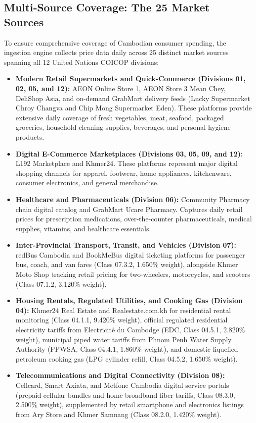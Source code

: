 \subsection{Multi-Source Coverage: The 25 Market Sources}
\hs To ensure comprehensive coverage of Cambodian consumer spending, the ingestion engine collects price data daily across 25 distinct market sources spanning all 12 United Nations COICOP divisions:
\begin{itemize}
    \item \textbf{Modern Retail Supermarkets and Quick-Commerce (Divisions 01, 02, 05, and 12):} AEON Online Store 1, AEON Store 3 Mean Chey, DeliShop Asia, and on-demand GrabMart delivery feeds (Lucky Supermarket Chroy Changva and Chip Mong Supermarket Eden). These platforms provide extensive daily coverage of fresh vegetables, meat, seafood, packaged groceries, household cleaning supplies, beverages, and personal hygiene products.
    \item \textbf{Digital E-Commerce Marketplaces (Divisions 03, 05, 09, and 12):} L192 Marketplace and Khmer24. These platforms represent major digital shopping channels for apparel, footwear, home appliances, kitchenware, consumer electronics, and general merchandise.
    \item \textbf{Healthcare and Pharmaceuticals (Division 06):} Community Pharmacy chain digital catalog and GrabMart Ucare Pharmacy. Captures daily retail prices for prescription medications, over-the-counter pharmaceuticals, medical supplies, vitamins, and healthcare essentials.
    \item \textbf{Inter-Provincial Transport, Transit, and Vehicles (Division 07):} redBus Cambodia and BookMeBus digital ticketing platforms for passenger bus, coach, and van fares (Class 07.3.2, 1.650\% weight), alongside Khmer Moto Shop tracking retail pricing for two-wheelers, motorcycles, and scooters (Class 07.1.2, 3.120\% weight).
    \item \textbf{Housing Rentals, Regulated Utilities, and Cooking Gas (Division 04):} Khmer24 Real Estate and Realestate.com.kh for residential rental monitoring (Class 04.1.1, 9.420\% weight), official regulated residential electricity tariffs from Electricit\'e du Cambodge (EDC, Class 04.5.1, 2.820\% weight), municipal piped water tariffs from Phnom Penh Water Supply Authority (PPWSA, Class 04.4.1, 1.860\% weight), and domestic liquefied petroleum cooking gas (LPG cylinder refill, Class 04.5.2, 1.650\% weight).
    \item \textbf{Telecommunications and Digital Connectivity (Division 08):} Cellcard, Smart Axiata, and Metfone Cambodia digital service portals (prepaid cellular bundles and home broadband fiber tariffs, Class 08.3.0, 2.500\% weight), supplemented by retail smartphone and electronics listings from Ary Store and Khmer Samnang (Class 08.2.0, 1.420\% weight).

\end{itemize}

